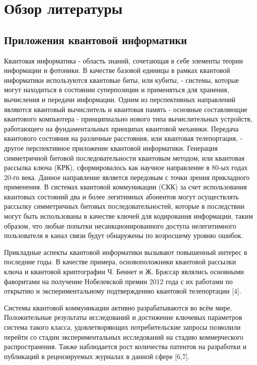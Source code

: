 \chapter{Обзор литературы} \label{ch:ch1}
\section{Приложения квантовой информатики} \label{sec:ch1/sec1}

Квантовая информатика \cite{makarov2006}- область знаний, сочетающая в себе элементы теории информации и фотоники. В качестве базовой единицы в рамках квантовой информатики используются квантовые биты, или кубиты, - системы, которые могут находиться в состоянии суперпозиции и применяться для хранения, вычисления и передачи информации. Одним из перспективных направлений являются квантовый вычислитель и квантовая память - основные составляющие квантового компьютера - принципиально нового типа вычислительных устройств, работающего на фундаментальных принципах квантовой механики. Передача квантового состояния на различные расстояния, или квантовая телепортация, - другое перспективное приложение квантовой информатики. Генерация симметричной битовой последовательности квантовым методом, или квантовая рассылка ключа (КРК), сформировалось как научное направление в 80-ых годах 20-го века. Данное направление является передовым с точки зрения прикладного применения. В системах квантовой коммуникации (СКК) за счет использования квантовых состояний два и более легитимных абонентов могут осуществлять рассылку симметричных битовых последовательностей, которые в последствии могут быть использованы в качестве ключей для кодирования информации, таким образом, что любые попытки несанкционированного доступа нелегитимного пользователя в канал связи будут обнаружены по возросшему уровню ошибок.


Прикладные аспекты квантовой информатики вызывают повышенный интерес в последние годы. В качестве примера, основоположники квантовой рассылки ключа и квантовой криптографии Ч. Беннет и Ж. Брассар являлись основными фаворитами на получение Нобелевской премии 2012 года с их работами по открытию и экспериментальному подтверждению квантовой телепортации [4].  

Системы квантовой коммуникации активно разрабатываются во всём мире. Положительные результаты исследований и достижение ключевых параметров система такого класса, удовлетворяющих потребительские запросы позволили перейти со стадии экспериментальных исследований на стадию коммерческого распространения. Также наблюдается рост количества патентов на разработки и публикаций в рецензируемых журналах в данной сфере [6,7].

